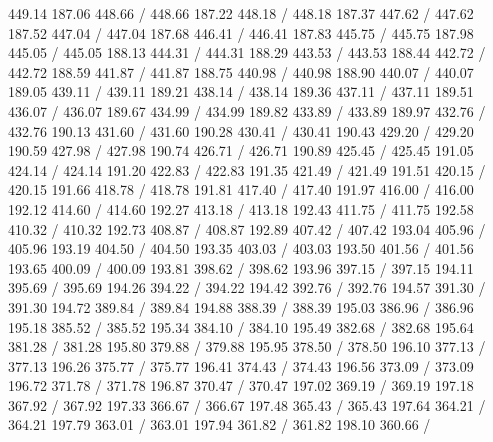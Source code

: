 { 449.14 187.06 448.66 /
 448.66 187.22 448.18 /
 448.18 187.37 447.62 /
 447.62 187.52 447.04 /
 447.04 187.68 446.41 /
 446.41 187.83 445.75 /
 445.75 187.98 445.05 /
 445.05 188.13 444.31 /
 444.31 188.29 443.53 /
 443.53 188.44 442.72 /
 442.72 188.59 441.87 /
 441.87 188.75 440.98 /
 440.98 188.90 440.07 /
 440.07 189.05 439.11 /
 439.11 189.21 438.14 /
 438.14 189.36 437.11 /
 437.11 189.51 436.07 /
 436.07 189.67 434.99 /
 434.99 189.82 433.89 /
 433.89 189.97 432.76 /
 432.76 190.13 431.60 /
 431.60 190.28 430.41 /
 430.41 190.43 429.20 /
 429.20 190.59 427.98 /
 427.98 190.74 426.71 /
 426.71 190.89 425.45 /
 425.45 191.05 424.14 /
 424.14 191.20 422.83 /
 422.83 191.35 421.49 /
 421.49 191.51 420.15 /
 420.15 191.66 418.78 /
 418.78 191.81 417.40 /
 417.40 191.97 416.00 /
 416.00 192.12 414.60 /
 414.60 192.27 413.18 /
 413.18 192.43 411.75 /
 411.75 192.58 410.32 /
 410.32 192.73 408.87 /
 408.87 192.89 407.42 /
 407.42 193.04 405.96 /
 405.96 193.19 404.50 /
 404.50 193.35 403.03 /
 403.03 193.50 401.56 /
 401.56 193.65 400.09 /
 400.09 193.81 398.62 /
 398.62 193.96 397.15 /
 397.15 194.11 395.69 /
 395.69 194.26 394.22 /
 394.22 194.42 392.76 /
 392.76 194.57 391.30 /
 391.30 194.72 389.84 /
 389.84 194.88 388.39 /
 388.39 195.03 386.96 /
 386.96 195.18 385.52 /
 385.52 195.34 384.10 /
 384.10 195.49 382.68 /
 382.68 195.64 381.28 /
 381.28 195.80 379.88 /
 379.88 195.95 378.50 /
 378.50 196.10 377.13 /
 377.13 196.26 375.77 /
 375.77 196.41 374.43 /
 374.43 196.56 373.09 /
 373.09 196.72 371.78 /
 371.78 196.87 370.47 /
 370.47 197.02 369.19 /
 369.19 197.18 367.92 /
 367.92 197.33 366.67 /
 366.67 197.48 365.43 /
 365.43 197.64 364.21 /
 364.21 197.79 363.01 /
 363.01 197.94 361.82 /
 361.82 198.10 360.66 /
}
